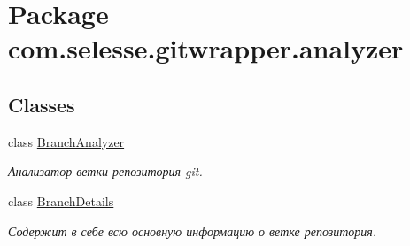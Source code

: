 \hypertarget{namespacecom_1_1selesse_1_1gitwrapper_1_1analyzer}{}\section{Package com.\+selesse.\+gitwrapper.\+analyzer}
\label{namespacecom_1_1selesse_1_1gitwrapper_1_1analyzer}
\subsection*{Classes}
\begin{DoxyCompactItemize}
\item 
class \hyperlink{classcom_1_1selesse_1_1gitwrapper_1_1analyzer_1_1_branch_analyzer}{Branch\+Analyzer}
\begin{DoxyCompactList}\small\item\em Анализатор ветки репозитория git. \end{DoxyCompactList}\item 
class \hyperlink{classcom_1_1selesse_1_1gitwrapper_1_1analyzer_1_1_branch_details}{Branch\+Details}
\begin{DoxyCompactList}\small\item\em Содержит в себе всю основную информацию о ветке репозитория. \end{DoxyCompactList}\end{DoxyCompactItemize}
